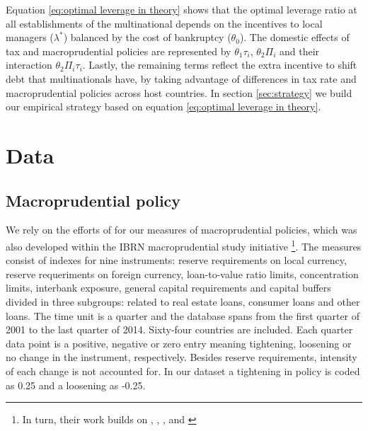 \documentclass[12pt]{article}
\begin{document}
    Equation \ref{eq:optimal leverage in theory} shows that the optimal leverage ratio at all establishments of the multinational depends on the incentives to local managers ($\lambda^*$) balanced by the cost of bankruptcy ($\theta_0$). The domestic effects of tax and macroprudential policies are represented by $\theta_1\tau_i$, $\theta_2\Pi_i$ and their interaction $\theta_2\Pi_i\tau_i$. Lastly, the remaining terms reflect the extra incentive to shift debt that multinationals have, by taking advantage of differences in tax rate and macroprudential policies across host countries. In section \ref{sec:strategy} we build our empirical strategy based on equation \ref{eq:optimal leverage in theory}.
    
	\section{Data} \label{sec:data}	
	\subsection{Macroprudential policy} \label{subsec:MPI}
	
	We rely on the efforts of \cite*{cerutti2017changes} for our measures of macroprudential policies, which was also developed within the IBRN macroprudential study initiative \footnote{In turn, their work builds on \cite{lim2011macroprudential}, \cite*{cerutti2015use}, \cite*{reinhardt2015regulatory}, \cite*{kuttner2016can} and \cite*{akinci2017effective}}. The measures consist of indexes for nine instruments: reserve requirements on local currency, reserve requeriments on foreign currency, loan-to-value ratio limits, concentration limits, interbank exposure, general capital requirements and capital buffers divided in three subgroups: related to real estate loans, consumer loans and other loans. The time unit is a quarter and the database spans from the first quarter of 2001 to the last quarter of 2014. Sixty-four countries are included. Each quarter data point is a positive, negative or zero entry meaning tightening, loosening or no change in the instrument, respectively. Besides reserve requirements, intensity of each change is not accounted for. In our dataset a tightening in policy is coded as 0.25 and a loosening as -0.25.
\end{document}
